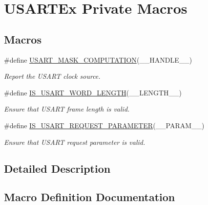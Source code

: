 \hypertarget{group___u_s_a_r_t_ex___private___macros}{}\section{U\+S\+A\+R\+T\+Ex Private Macros}
\label{group___u_s_a_r_t_ex___private___macros}
\subsection*{Macros}
\begin{DoxyCompactItemize}
\item 
\#define \hyperlink{group___u_s_a_r_t_ex___private___macros_gad57ccc8ecd4497f3d5d7f8da10e00158}{U\+S\+A\+R\+T\+\_\+\+M\+A\+S\+K\+\_\+\+C\+O\+M\+P\+U\+T\+A\+T\+I\+ON}(\+\_\+\+\_\+\+H\+A\+N\+D\+L\+E\+\_\+\+\_\+)
\begin{DoxyCompactList}\small\item\em Report the U\+S\+A\+RT clock source. \end{DoxyCompactList}\item 
\#define \hyperlink{group___u_s_a_r_t_ex___private___macros_ga8cacb83de23342eddca6ad3d07f56e5c}{I\+S\+\_\+\+U\+S\+A\+R\+T\+\_\+\+W\+O\+R\+D\+\_\+\+L\+E\+N\+G\+TH}(\+\_\+\+\_\+\+L\+E\+N\+G\+T\+H\+\_\+\+\_\+)
\begin{DoxyCompactList}\small\item\em Ensure that U\+S\+A\+RT frame length is valid. \end{DoxyCompactList}\item 
\#define \hyperlink{group___u_s_a_r_t_ex___private___macros_ga493fc7a1c42648b29223e8c1608a6fa8}{I\+S\+\_\+\+U\+S\+A\+R\+T\+\_\+\+R\+E\+Q\+U\+E\+S\+T\+\_\+\+P\+A\+R\+A\+M\+E\+T\+ER}(\+\_\+\+\_\+\+P\+A\+R\+A\+M\+\_\+\+\_\+)
\begin{DoxyCompactList}\small\item\em Ensure that U\+S\+A\+RT request parameter is valid. \end{DoxyCompactList}\end{DoxyCompactItemize}


\subsection{Detailed Description}


\subsection{Macro Definition Documentation}
\mbox{\label{group___u_s_a_r_t_ex___private___macros_ga493fc7a1c42648b29223e8c1608a6fa8}} 
